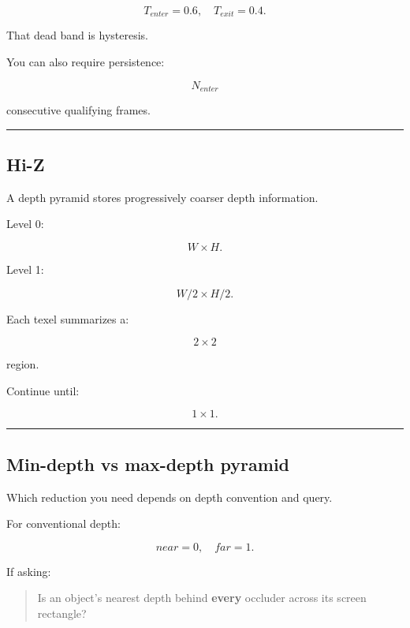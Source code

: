 \[
T_{enter}=0.6,
\quad
T_{exit}=0.4.
\]

That dead band is hysteresis.

You can also require persistence:

\[
N_{enter}
\]

consecutive qualifying frames.

\begin{center}\rule{0.5\linewidth}{0.5pt}\end{center}

\subsection{Hi-Z}\label{04-visual-computing-ii-ch040-hi-z}

\hypertarget{04-visual-computing-ii-ch040-hi-z}{}

A depth pyramid stores progressively coarser depth information.

Level 0:

\[
W\times H.
\]

Level 1:

\[
W/2\times H/2.
\]

Each texel summarizes a:

\[
2\times2
\]

region.

Continue until:

\[
1\times1.
\]

\begin{center}\rule{0.5\linewidth}{0.5pt}\end{center}

\subsection{Min-depth vs max-depth pyramid}\label{04-visual-computing-ii-ch040-min-depth-vs-max-depth-pyramid}

\hypertarget{04-visual-computing-ii-ch040-min-depth-vs-max-depth-pyramid}{}

Which reduction you need depends on depth convention and query.

For conventional depth:

\[
near=0,\quad far=1.
\]

If asking:

\begin{quote}
Is an object's nearest depth behind \textbf{every} occluder across its screen rectangle?
\end{quote}

